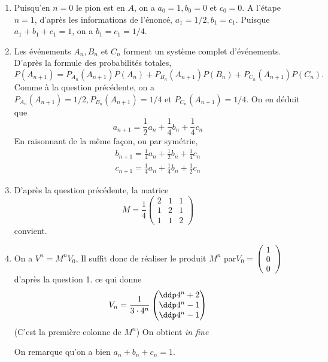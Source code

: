 \documentclass[a4paper, 11pt,reqno]{article}
\begin{document}
\begin{correction}
\begin{enumerate}


\item  Puisqu'en $n=0$ le pion est en $A$, on a $a_{0}=1, b_{0}=0$ et $c_{0}=0 .$ A l'étape $n=1$, d'après les informations de l'énoncé, $a_{1}=1 / 2, b_{1}=c_{1}$. Puisque $a_{1}+b_{1}+c_{1}=1$, on a $b_{1}=c_{1}=1 / 4$.
\item  Les événements $A_{n}, B_{n}$ et $C_{n}$ forment un système complet d'événements. D'après la formule des probabilités totales,
$$
P\left(A_{n+1}\right)=P_{A_{n}}\left(A_{n+1}\right) P\left(A_{n}\right)+P_{B_{n}}\left(A_{n+1}\right) P\left(B_{n}\right)+P_{C_{n}}\left(A_{n+1}\right) P\left(C_{n}\right) .
$$
Comme à la question précédente, on a $P_{A_{n}}\left(A_{n+1}\right)=1 / 2, P_{B_{n}}\left(A_{n+1}\right)=1 / 4$ et $P_{C_{n}}\left(A_{n+1}\right)=1 / 4$. On en déduit que
$$
a_{n+1}=\frac{1}{2} a_{n}+\frac{1}{4} b_{n}+\frac{1}{4} c_{n}
$$
En raisonnant de la même façon, ou par symétrie,
$$
\begin{gathered}
b_{n+1}=\frac{1}{4} a_{n}+\frac{1}{2} b_{n}+\frac{1}{4} c_{n} \\
c_{n+1}=\frac{1}{4} a_{n}+\frac{1}{4} b_{n}+\frac{1}{2} c_{n}
\end{gathered}
$$
\item  D'après la question précédente, la matrice
$$
M=\frac{1}{4}\left(\begin{array}{lll}
2 & 1 & 1 \\
1 & 2 & 1 \\
1 & 1 & 2
\end{array}\right)
$$
convient.
\item  On a $V^{n}=M^{n} V_{0}$, Il suffit donc de réaliser le produit $M^n $ par$V_0 = \begin{pmatrix}
1\\
0\\
0
\end{pmatrix} $ d'après la question 1.  ce qui donne
$$
V_n=\frac{1}{3 \cdot 4^{n}}
\begin{pmatrix}
\ddp 4^{n}+2 \\
\ddp 4^{n}-1\\
\ddp 4^{n}-1
\end{pmatrix}
$$
(C'est la première colonne de $M^n$) 
On obtient \emph{in fine}


On remarque qu'on a bien $a_{n}+b_{n}+c_{n}=1$.
\end{enumerate}
\end{correction}
\end{document}
